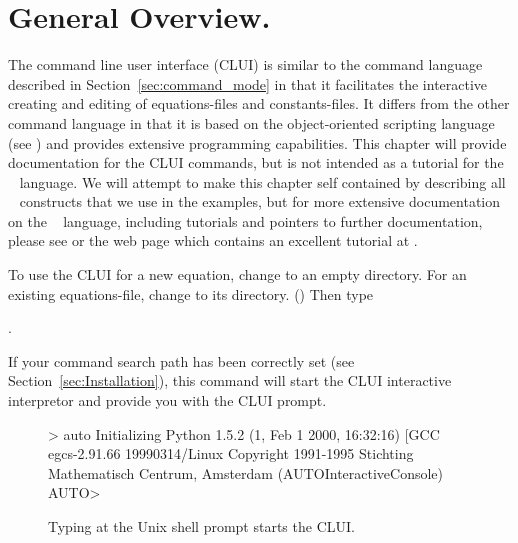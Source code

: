 \documentclass[12pt]{report}
\begin{document}
 \section{ General Overview.} \label{sec:CLUI_Overview}
 The \AUTO command line user interface (CLUI) is similar
 to the command language described in Section~\ref{sec:command_mode}
 in that it facilitates the interactive creating and editing of 
 equations-files and constants-files.
 It differs from the other command language in that it is based 
 on the object-oriented scripting language \python~ (see  \citeyear{Lut:96})
 and provides extensive programming capabilities.
 This chapter will provide documentation for the \AUTO CLUI commands,
 but is not intended as a tutorial for the \python~ language.
 We will attempt to make this chapter self contained by describing
 all \python~ constructs that we use in the examples, but
 for more extensive documentation on the \python~ language,
 including tutorials and pointers to further documentation,
 please see  \citeyear{Lut:96} or the
 web page  which contains
 an excellent tutorial at 
 .

 To use the CLUI for a new equation, change to an empty directory.
 For an existing equations-file, change to its directory.
 ()
 Then type 

 \centerline {.}

 If your command search path has been correctly set (see
 Section~\ref{sec:Installation}), this command will start the \AUTO CLUI
 interactive interpretor and provide you with the \AUTO CLUI prompt.

 \begin{figure}[htbp]
 {\small 
 \begin{center} \begin{boxedverbatim}
 > auto
 Initializing
 Python 1.5.2 (1, Feb  1 2000, 16:32:16)  [GCC egcs-2.91.66 19990314/Linux 
 Copyright 1991-1995 Stichting Mathematisch Centrum, Amsterdam
 (AUTOInteractiveConsole)
 AUTO> 
 \end{boxedverbatim}
 \end{center}
 }
 \caption[Starting the \AUTO CLUI.]
 {Typing  at the Unix shell prompt starts the
 \AUTO CLUI.  }
 \label{exa:clui_starting}
 \end{figure}
\end{document}
